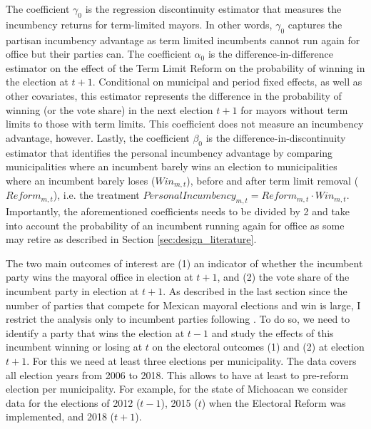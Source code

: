 \documentclass[12pt]{amsart}
\makeatletter
\def\subsection{\@startsection{subsection}{2}
	\z@{.8\linespacing\@plus.7\linespacing}{.7\linespacing}{\large}}
\numberwithin{equation}{section}
\theoremstyle{definition}
\theoremstyle{definition}
\theoremstyle{definition}
\makeatother
\begin{document}
The coefficient $\gamma_0$ is the regression discontinuity estimator that measures the incumbency returns for term-limited mayors. In other words, $\gamma_0$ captures the partisan incumbency advantage as term limited incumbents cannot run again for office but their parties can. The coefficient $\alpha_0$ is the difference-in-difference estimator on the effect of the Term Limit Reform on the probability of winning in the election at $t+1$. Conditional on municipal and period fixed effects, as well as other covariates, this estimator represents the difference in the probability of winning (or the vote share) in the next election $t+1$ for mayors without term limits to those with term limits. This coefficient does not measure an incumbency advantage, however. Lastly, the coefficient $\beta_0$ is the difference-in-discontinuity estimator that identifies the personal incumbency advantage by comparing municipalities where an incumbent barely wins an election to municipalities where an incumbent barely loses ($Win_{m,t}$), before and after term limit removal ($Reform_{m,t}$), i.e. the treatment $PersonalIncumbency_{m,t}=Reform_{m,t} \cdot Win_{m,t}$. Importantly, the aforementioned coefficients needs to be divided by 2 and take into account the probability of an incumbent running again for office as some may retire as described in Section \ref{sec:design_literature}. 


\subsection{Data}  

The two main outcomes of interest are (1) an indicator of whether the incumbent party wins the mayoral office in election at $t+1$, and (2) the vote share of the incumbent party in election at $t+1$. As described in the last section since the number of parties that compete for Mexican mayoral elections and win is large, I restrict the analysis only to incumbent parties following \citet{klasnja_titiunik_2017}. To do so, we need to identify a party that wins the election at $t-1$ and study the effects of this incumbent winning or losing at $t$ on the electoral outcomes (1) and (2) at election $t+1$. For this we need at least three elections per municipality. The data covers all election years from 2006 to 2018. This allows to have at least to pre-reform election per municipality. For example, for the state of Michoacan we consider data for the elections of 2012 ($t-1$), 2015 ($t$) when the Electoral Reform was implemented, and 2018 ($t+1$). 
\end{document}
